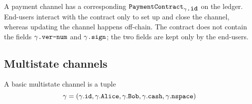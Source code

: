     A payment channel has a corresponding
    $\mbox{\texttt{PaymentContract}}_{\gamma\mbox{\texttt{.id}}}$ on the ledger. End-users
    interact with the contract only to set up and close the channel, whereas updating the
    channel happens off-chain. The contract does not contain the fields
    $\gamma\mbox{\texttt{.ver-num}}$ and $\gamma\mbox{\texttt{.sign}}$; the two fields are
    kept only by the end-users.

  \subsection{Multistate channels}
    A basic multistate channel is a tuple
    \begin{equation*}
      \gamma = \left(\gamma\mbox{.\texttt{id}}, \gamma\mbox{.\texttt{Alice}},
      \gamma\mbox{.\texttt{Bob}}, \gamma\mbox{.\texttt{cash}},
      \gamma\mbox{.\texttt{nspace}}\right)
    \end{equation*}

